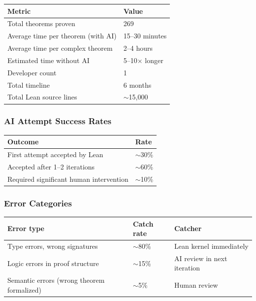 \begin{center}
\begin{tabular}{ll}
\toprule
Metric & Value \\
\midrule
Total theorems proven & 269 \\
Average time per theorem (with AI) & 15--30 minutes \\
Average time per complex theorem & 2--4 hours \\
Estimated time without AI & 5--10$\times$ longer \\
Developer count & 1 \\
Total timeline & 6 months \\
Total Lean source lines & $\sim$15,000 \\
\bottomrule
\end{tabular}
\end{center}

\subsubsection*{AI Attempt Success Rates}

\begin{center}
\begin{tabular}{ll}
\toprule
Outcome & Rate \\
\midrule
First attempt accepted by Lean & $\sim$30\% \\
Accepted after 1--2 iterations & $\sim$60\% \\
Required significant human intervention & $\sim$10\% \\
\bottomrule
\end{tabular}
\end{center}

\subsubsection*{Error Categories}

\begin{center}
\begin{tabular}{lll}
\toprule
Error type & Catch rate & Catcher \\
\midrule
Type errors, wrong signatures & $\sim$80\% & Lean kernel immediately \\
Logic errors in proof structure & $\sim$15\% & AI review in next iteration \\
Semantic errors (wrong theorem formalized) & $\sim$5\% & Human review \\
\bottomrule
\end{tabular}
\end{center}

